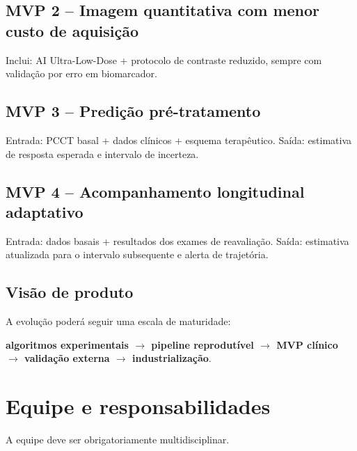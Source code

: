 \documentclass[11pt,a4paper]{article}
\begin{document}
\subsection{MVP 2 -- Imagem quantitativa com menor custo de aquisição}
Inclui: AI Ultra-Low-Dose + protocolo de contraste reduzido, sempre com validação por erro em biomarcador.

\subsection{MVP 3 -- Predição pré-tratamento}
Entrada: PCCT basal + dados clínicos + esquema terapêutico. Saída: estimativa de resposta esperada e intervalo de incerteza.

\subsection{MVP 4 -- Acompanhamento longitudinal adaptativo}
Entrada: dados basais + resultados dos exames de reavaliação. Saída: estimativa atualizada para o intervalo subsequente e alerta de trajetória.

\subsection{Visão de produto}
A evolução poderá seguir uma escala de maturidade:
\begin{center}
\textbf{algoritmos experimentais $\rightarrow$ pipeline reprodutível $\rightarrow$ MVP clínico $\rightarrow$ validação externa $\rightarrow$ industrialização}.
\end{center}

\section{Equipe e responsabilidades}

A equipe deve ser obrigatoriamente multidisciplinar.
\end{document}
